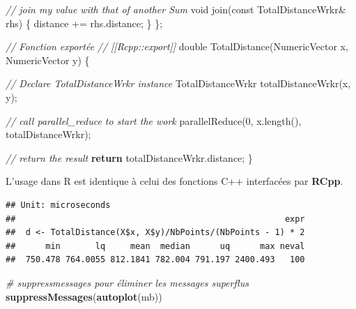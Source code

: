 \documentclass[
  12pt,
  french,
  a4paper,
  extrafontsizes,onecolumn,openright
  ]{memoir}
\newenvironment{Shaded}{\begin{snugshade}}{\end{snugshade}}
\newcommand{\AttributeTok}[1]{\textcolor[rgb]{0.77,0.63,0.00}{#1}}
\newcommand{\CommentTok}[1]{\textcolor[rgb]{0.56,0.35,0.01}{\textit{#1}}}
\newcommand{\ControlFlowTok}[1]{\textcolor[rgb]{0.13,0.29,0.53}{\textbf{#1}}}
\newcommand{\DataTypeTok}[1]{\textcolor[rgb]{0.13,0.29,0.53}{#1}}
\newcommand{\DecValTok}[1]{\textcolor[rgb]{0.00,0.00,0.81}{#1}}
\newcommand{\KeywordTok}[1]{\textcolor[rgb]{0.13,0.29,0.53}{\textbf{#1}}}
\newcommand{\NormalTok}[1]{#1}
\newcommand{\OperatorTok}[1]{\textcolor[rgb]{0.81,0.36,0.00}{\textbf{#1}}}
\newcommand{\StringTok}[1]{\textcolor[rgb]{0.31,0.60,0.02}{#1}}
\newlength{\rf}
\begin{document}
\begin{Shaded}
\begin{Highlighting}[]
  \CommentTok{// join my value with that of another Sum}
  \DataTypeTok{void}\NormalTok{ join(}\AttributeTok{const}\NormalTok{ TotalDistanceWrkr& rhs) \{ }
\NormalTok{    distance += rhs.distance; }
\NormalTok{  \}}
\NormalTok{\};}


\CommentTok{// Fonction exportée}
\CommentTok{// [[Rcpp::export]]}
\DataTypeTok{double}\NormalTok{ TotalDistance(NumericVector x, NumericVector y) \{}
  
  \CommentTok{// Declare TotalDistanceWrkr instance}
\NormalTok{  TotalDistanceWrkr totalDistanceWrkr(x, y);}
  
  \CommentTok{// call parallel_reduce to start the work}
\NormalTok{  parallelReduce(}\DecValTok{0}\NormalTok{, x.length(), totalDistanceWrkr);}
  
  \CommentTok{// return the result}
  \ControlFlowTok{return}\NormalTok{ totalDistanceWrkr.distance;}
\NormalTok{\}}
\end{Highlighting}
\end{Shaded}

\normalsize

L'usage dans R est identique à celui des fonctions C++ interfacées par \textbf{RCpp}.

\scriptsize

\begin{Shaded}
\end{Shaded}

\begin{verbatim}
## Unit: microseconds
##                                                      expr
##  d <- TotalDistance(X$x, X$y)/NbPoints/(NbPoints - 1) * 2
##      min       lq     mean  median      uq      max neval
##  750.478 764.0055 812.1841 782.004 791.197 2400.493   100
\end{verbatim}

\begin{Shaded}
\begin{Highlighting}[]
\CommentTok{# suppressmessages pour éliminer les messages superflus}
\KeywordTok{suppressMessages}\NormalTok{(}\KeywordTok{autoplot}\NormalTok{(mb))}
\end{Highlighting}
\end{Shaded}
\end{document}
